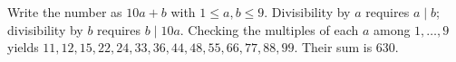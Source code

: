 Write the number as $10a+b$ with $1\le a,b\le9$. Divisibility by $a$ requires $a\mid b$; divisibility by $b$ requires $b\mid10a$. Checking the multiples of each $a$ among $1,\ldots,9$ yields $11,12,15,22,24,33,36,44,48,55,66,77,88,99$. Their sum is $\boxed{630}$.
